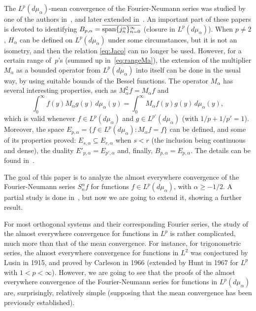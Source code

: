 \documentclass[10pt,a4paper]{article}
\newcommand{\htr}{H_{\alpha}} %
\newcommand{\ma}{M_{\alpha}}
\newcommand{\mua}{d\mu_\alpha}
\newcommand{\jna}{j_n^{\alpha}}
\newcommand{\Sna}{S_n^{\alpha}}
\newcommand{\spa}{\operatornamewithlimits{span}} %
\theoremstyle{plain}
\begin{document}
The $L^p(\mua)$-mean convergence of the Fourier-Neumann series was studied by one of the authors in~\cite{V}, and later extended in~\cite{CiGPV}.
%
An important part of these papers is devoted to identifying $B_{p,\alpha} = \overline{\spa\{\jna\}_{n=0}^\infty}$ (closure in $L^p(\mua)$). When $p \ne 2$, $\htr$ can be defined on $L^p(\mua)$ under some circumstances, but it is not an isometry, and then the relation \eqref{eq:Jaco} can no longer be used. However, for a certain range of~$p$'s (summed up in~\eqref{eq:rangeMa}), the extension of the multiplier $\ma$ as a bounded operator from $L^p(\mua)$ into itself can be done in the usual way, by using suitable bounds of the Bessel functions. The operator $\ma$ has several interesting properties, such as 
$\ma^2 f = \ma f$ and
\begin{equation}
\label{eq:multi}
   \int_0^\infty f(y) \ma g(y) \,\mua(y) = \int_0^\infty \ma f(y) g(y) \,\mua(y),
\end{equation}
which is valid whenever $f \in L^p(\mua)$ and $g \in L^{p'}(\mua)$ (with $1/p+1/p'=1$).
Moreover, the space $E_{p,\alpha} = \{ f \in L^p(\mua): \ma f = f \}$ can be defined, and some of its properties proved: $E_{s,\alpha} \subseteq E_{r,\alpha}$ when $s<r$ (the inclusion being continuous and dense), the duality $E'_{p,\alpha} = E_{p',\alpha}$ and, finally, $B_{p,\alpha} = E_{p,\alpha}$. The details can be found in~\cite{V, CiStV}.

The goal of this paper is to analyze the almost everywhere convergence of the Fourier-Neumann series $\Sna f$ for functions $f \in L^p(\mua)$, with $\alpha \ge -1/2$. A partial study is done in~\cite{CiGPV}, but now we are going to extend it, showing a further result. 

For most orthogonal systems and their corresponding Fourier series, the study of the almost everywhere convergence for functions in $L^p$ is rather complicated, much more than that of the mean convergence. 
For instance, for trigonometric series, the almost everywhere convergence for functions in $L^2$ was conjectured by Lusin in 1915, and proved by Carleson in 1966 (extended by Hunt in 1967 for $L^p$ with $1<p<\infty$). However, we are going to see that the proofs of the almost everywhere convergence of the Fourier-Neumann series for functions in $L^p(\mua)$ are, surprisingly, relatively simple (supposing that the mean convergence has been previously established).
\end{document}
